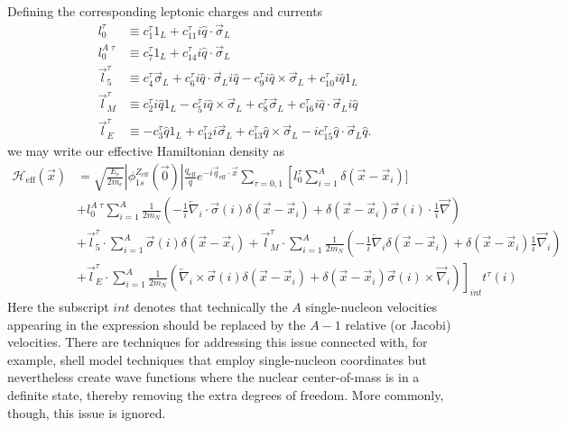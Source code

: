 \documentclass{book}[letterpaper,12pt]
\begin{document}
Defining the corresponding leptonic charges and currents
\begin{equation}
\begin{split}
l_0^{\tau}&\equiv c_1^{\tau}1_L+c_{11}^{\tau}i\hat{q}\cdot\vec{\sigma}_L\\
l_0^{A\;\tau}&\equiv c_7^{\tau}1_L+c_{14}^{\tau}i\hat{q}\cdot\vec{\sigma}_L\\
\vec{l}_5^{\tau}&\equiv c_4^{\tau}\vec{\sigma}_L+c_6^{\tau}i\hat{q}\cdot\vec{\sigma}_Li\hat{q}-c_9^{\tau}i\hat{q}\times\vec{\sigma}_L+c_{10}^{\tau}i\hat{q}1_L\\
\vec{l}_M^{\tau}&\equiv c_2^{\tau}i\hat{q}1_L-c_5^{\tau}i\hat{q}\times\vec{\sigma}_L+c_8^{\tau}\vec{\sigma}_L+c_{16}^{\tau}i\hat{q}\cdot\vec{\sigma}_Li\hat{q}\\
\vec{l}_E^{\tau}&\equiv -c_3^{\tau}\hat{q}1_L+c_{12}^{\tau}i\vec{\sigma}_L+c_{13}^{\tau}\hat{q}\times\vec{\sigma}_L-ic_{15}^{\tau}\hat{q}\cdot\vec{\sigma}_L\hat{q}.
\label{eq:leptonic_currents}
\end{split}
\end{equation}
we may write our effective Hamiltonian density as
\begin{equation}
\begin{split}
\mathcal{H}_\mathrm{eff}(\vec{x})&=\sqrt{\frac{E_e}{2m_e}}|\phi_{1s}^{Z_\mathrm{eff}}(\vec{0})|\frac{q_\mathrm{eff}}{q}e^{-i\vec{q}_\mathrm{eff}\cdot\vec{x}}\sum_{\tau=0,1}\left[l_0^{\tau}\sum_{i=1}^A\delta(\vec{x}-\vec{x}_i)]\right.\\
&\left.+l_0^{A\;\tau}\sum_{i=1}^A\frac{1}{2m_N}\left(-\frac{1}{i}\overleftarrow{\nabla}_i\cdot\vec{\sigma}(i)\delta(\vec{x}-\vec{x}_i)+\delta(\vec{x}-\vec{x}_i)\vec{\sigma}(i)\cdot\frac{1}{i}\overrightarrow{\nabla}\right)\right.\\
&+\vec{l}_5^{\tau}\cdot\sum_{i=1}^A\vec{\sigma}(i)\delta(\vec{x}-\vec{x}_i)+\vec{l}_M^{\tau}\cdot\sum_{i=1}^A\frac{1}{2m_N}\left(-\frac{1}{i}\overleftarrow{\nabla}_i\delta(\vec{x}-\vec{x}_i)+\delta(\vec{x}-\vec{x}_i)\frac{1}{i}\overrightarrow{\nabla}_i\right)\\
&\left.+\vec{l}_E^{\tau}\cdot\sum_{i=1}^A\frac{1}{2m_N}\left(\overleftarrow{\nabla}_i\times\vec{\sigma}(i)\delta(\vec{x}-\vec{x}_i)+\delta(\vec{x}-\vec{x}_i)\vec{\sigma}(i)\times\overrightarrow{\nabla}_i\right)\right]_{int} t^{\tau}(i)
\end{split}
\label{eq:H_NRET}
\end{equation}
Here the subscript $int$ denotes that technically the $A$ single-nucleon velocities appearing in the expression should be replaced by the $A-1$ relative (or Jacobi) velocities. There are techniques for addressing this issue connected with, for example, shell model techniques that employ single-nucleon coordinates but nevertheless create wave functions where the nuclear center-of-mass is in a definite state, thereby removing the extra degrees of freedom. More commonly, though, this issue is ignored.
\end{document}
